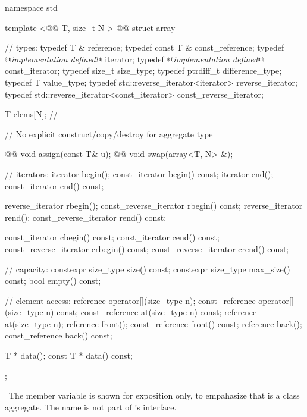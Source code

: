 \documentclass[american,twoside]{book}
\begin{document}
\begin{codeblock}
namespace std {
  template <@@ T, size_t N >
  @@
  struct array {
    //  types:
    typedef T &                                   reference;
    typedef const T &                             const_reference;
    typedef @{\itshape implementation defined}@                iterator;
    typedef @{\itshape implementation defined}@                const_iterator;
    typedef size_t                                size_type;
    typedef ptrdiff_t                             difference_type;
    typedef T                                     value_type;
    typedef std::reverse_iterator<iterator>       reverse_iterator;
    typedef std::reverse_iterator<const_iterator> const_reverse_iterator;

    T       elems[N];           // \expos

    // No explicit construct/copy/destroy for aggregate type

    @@ void assign(const T& u);
    @@ void swap(array<T, N> &);

    // iterators:
    iterator               begin();
    const_iterator         begin() const;
    iterator               end();
    const_iterator         end() const;

    reverse_iterator       rbegin();
    const_reverse_iterator rbegin() const;
    reverse_iterator       rend();
    const_reverse_iterator rend() const;

    const_iterator         cbegin() const;
    const_iterator         cend() const;
    const_reverse_iterator crbegin() const;
    const_reverse_iterator crend() const;

    // capacity:
    constexpr size_type size() const;
    constexpr size_type max_size() const;
    bool      empty() const;

    // element access:
    reference       operator[](size_type n);
    const_reference operator[](size_type n) const;
    const_reference at(size_type n) const;
    reference       at(size_type n);
    reference       front();
    const_reference front() const;
    reference       back();
    const_reference back() const;

    T *       data();
    const T * data() const;
  };
}
\end{codeblock}

\pnum
\enternote\ The member variable  is shown for exposition only,
to empahasize that  is a class aggregate.  The name 
is not part of 's interface. \exitnote\
\end{document}
